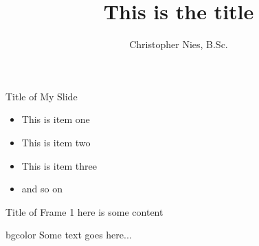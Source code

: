 \documentclass[aspectratio=169]{beamer}
\title{This is the title}
\author{Christopher Nies, B.Sc.}
\institute{Chair of Structural Mechanics, University of Siegen}
\begin{document}
\begin{frame}
    \titlepage 
\end{frame}

\begin{frame}[t]{Title of My Slide}%
\begin{itemize}
    \item This is item one
    \item This is item two
    \item This is item three
    \item and so on   
\end{itemize}
\end{frame}

\begin{frame}[t]{Title of Frame 1}
    here is some content
\end{frame}

\begin{frame}
\begin{beamercolorbox}[rounded=true, center, shadow=true,wd=6cm]{bgcolor}
    Some text goes here...
\end{beamercolorbox}
\end{frame}
\end{document}
